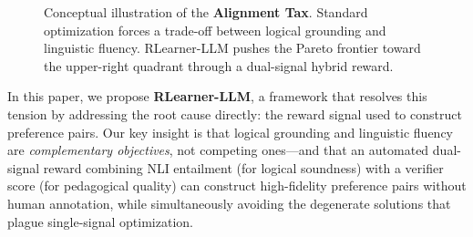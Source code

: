 \begin{figure}[h]
\centering
{}
\caption{Conceptual illustration of the \textbf{Alignment Tax}. Standard optimization forces a trade-off between logical grounding and linguistic fluency. RLearner-LLM pushes the Pareto frontier toward the upper-right quadrant through a dual-signal hybrid reward.}
\label{fig:alignment_tax}
\end{figure}

In this paper, we propose \textbf{RLearner-LLM}, a framework that resolves this tension by addressing the root cause directly: the reward signal used to construct preference pairs. Our key insight is that logical grounding and linguistic fluency are \textit{complementary objectives}, not competing ones---and that an automated dual-signal reward combining NLI entailment (for logical soundness) with a verifier score (for pedagogical quality) can construct high-fidelity preference pairs without human annotation, while simultaneously avoiding the degenerate solutions that plague single-signal optimization.

